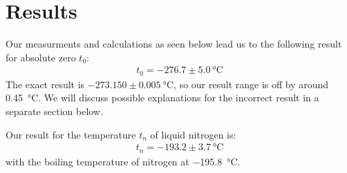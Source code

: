 \section{Results}

Our measurments and calculations as seen below lead us to the following result for absolute zero $t_0$:
\begin{align}
	t_0 = -276.7 \pm \SI{5.0}{\degreeCelsius} 
\end{align}
The exact result is $-273.150 \pm \SI{0.005}{\degreeCelsius}$, so our result range is off by around \SI{0.45}{\degreeCelsius}. We will discuss possible explanations for the incorrect result in a separate section below. 


Our result for the temperature $t_n$ of liquid nitrogen is:
\begin{align}
	t_n = -193.2 \pm \SI{3.7}{\degreeCelsius} 
\end{align}
with the boiling temperature of nitrogen at \SI{-195.8}{\degreeCelsius}.
